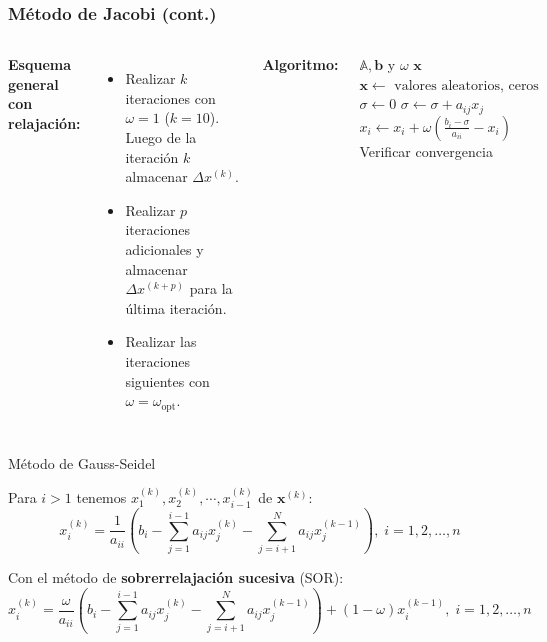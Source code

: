 \documentclass[9pt, aspectratio=169]{beamer}
\begin{document}
\begin{frame}
	\frametitle{Método de Jacobi (cont.)}
	\begin{columns}[c]
		\textbf{Esquema general con relajación:}
		\begin{itemize}
			\item Realizar $k$ iteraciones con $\omega = 1$ ($k = 10$). Luego de la iteración $k$ almacenar $\Delta x^{(k)}$.
			\item Realizar $p$ iteraciones adicionales y almacenar $\Delta x^{(k+p)}$ para la última iteración.
			\item Realizar las iteraciones siguientes con $\omega = \omega_{\text{opt}}$.
		\end{itemize} \pause

		\textbf{Algoritmo:}
		\begin{algorithmic}[1]
			\Require $\mathbb{A}, \mathbf{b}$ y $\omega$ 
			\Ensure $\mathbf{x}$ 
			\State $\mathbf{x} \gets \text{ valores aleatorios, ceros}$
			\Repeat
			\State $\sigma \gets 0$
			\State $\sigma \gets \sigma + a_{ij} x_j$
			\EndIf
			\EndFor {}
			\State $x_i \gets x_i+\omega \left( \frac{b_i - \sigma}{a_{ii}} - x_i \right)$
			\EndFor {}
			\State Verificar convergencia
		\end{algorithmic}
	\end{columns}
\end{frame}

\begin{frame}{Método de Gauss-Seidel}

	Para $i > 1$ tenemos $x_1^{(k)}, x_2^{(k)}, \cdots,x_{i-1}^{(k)}$ de $\bm{x}^{(k)}$:
	\begin{equation*}
		x_i^{(k)} = \dfrac{1}{a_{ii}} \left( b_i - \sum_{j=1}^{i-1} a_{ij}x_j^{(k)} - \sum_{j=i + 1}^N a_{ij}x_j^{(k-1)} \right), \;  i = 1, 2, \ldots, n
	\end{equation*} \pause

	Con el método de \textbf{sobrerrelajación sucesiva} (SOR):
	\begin{equation*}
		x_i^{(k)} = \dfrac{\omega}{a_{ii}} \left( b_i - \sum_{j=1}^{i-1} a_{ij}x_j^{(k)} - \sum_{j=i + 1}^N a_{ij}x_j^{(k-1)} \right) + (1 - \omega) x_i^{(k - 1)}, \;  i = 1, 2, \ldots, n
	\end{equation*} \pause

\end{frame}
\end{document}
